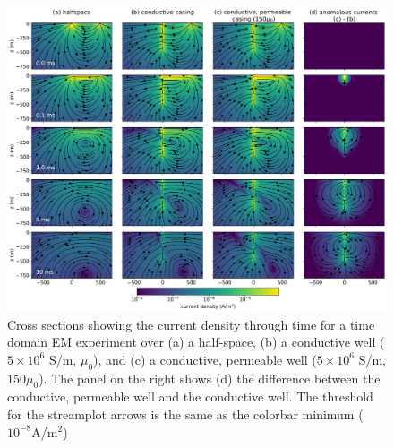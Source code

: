 \begin{figure}
    \begin{center}
    \includegraphics[width=\textwidth]{figures/tdem-cross-section-currents.png}
    \end{center}
\caption{Cross sections showing the current density through time for a time domain EM experiment over (a) a half-space, (b) a conductive well ($5\times10^6$ S/m, $\mu_0$), and (c) a conductive, permeable well ($5\times10^6$ S/m, $150\mu_0$). The panel on the right shows (d) the difference between the conductive, permeable well and the conductive well. The threshold for the streamplot arrows is the same as the colorbar minimum ($10^{-8}$A/m$^2$)
}
\label{fig:tdem-cross-section-currents}
\end{figure}



